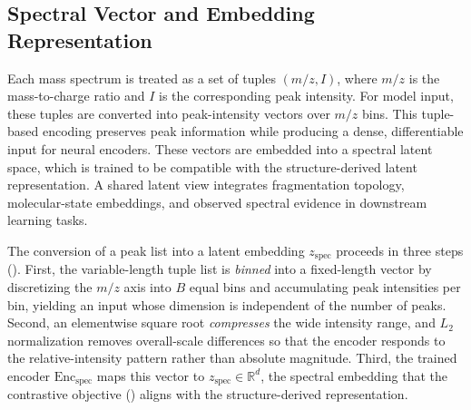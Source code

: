 \subsection{Spectral Vector and Embedding Representation}
\label{sec:spectrumEnc}
Each mass spectrum is treated as a set of tuples $(m/z, I)$, where $m/z$ is the mass-to-charge ratio and $I$ is the corresponding peak intensity.
For model input, these tuples are converted into peak-intensity vectors over $m/z$ bins.
This tuple-based encoding preserves peak information while producing a dense, differentiable input for neural encoders.
These vectors are embedded into a spectral latent space, which is trained to be compatible with the structure-derived latent representation.
A shared latent view integrates fragmentation topology, molecular-state embeddings, and observed spectral evidence in downstream learning tasks.

The conversion of a peak list into a latent embedding $z_{\mathrm{spec}}$ proceeds in three steps ().
First, the variable-length tuple list is \emph{binned} into a fixed-length vector by discretizing the $m/z$ axis into $B$ equal bins and accumulating peak intensities per bin, yielding an input whose dimension is independent of the number of peaks.
Second, an elementwise square root \emph{compresses} the wide intensity range, and $L_2$ normalization removes overall-scale differences so that the encoder responds to the relative-intensity pattern rather than absolute magnitude.
Third, the trained encoder $\mathrm{Enc}_{\mathrm{spec}}$ maps this vector to $z_{\mathrm{spec}} \in \mathbb{R}^{d}$, the spectral embedding that the contrastive objective () aligns with the structure-derived representation.


